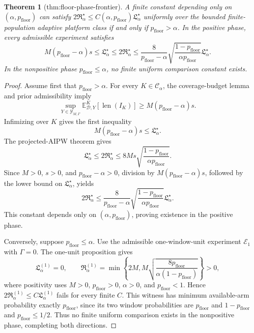 \documentclass{article}
\newtheorem{theorem}{Theorem}
\begin{document}
\begin{theorem}[thm:floor-phase-frontier]\label{thm:floor-phase-frontier}
A finite constant depending only on \((\alpha,p_{\mathrm{floor}})\) can satisfy \(2\mathfrak R_\alpha^\star\le C(\alpha,p_{\mathrm{floor}})\mathfrak L_\alpha^\star\) uniformly over the bounded finite-population adaptive platform class if and only if \(p_{\mathrm{floor}}>\alpha\). In the positive phase, every admissible experiment satisfies \[M(p_{\mathrm{floor}}-\alpha)s\le\mathfrak L_\alpha^\star\le2\mathfrak R_\alpha^\star\le\frac{8}{p_{\mathrm{floor}}-\alpha}\sqrt{\frac{1-p_{\mathrm{floor}}}{\alpha p_{\mathrm{floor}}}}\mathfrak L_\alpha^\star.\] In the nonpositive phase \(p_{\mathrm{floor}}\le\alpha\), no finite uniform comparison constant exists.
\end{theorem}
\begin{proof}
Assume first that \(p_{\mathrm{floor}}>\alpha\).  For every \(K\in\mathcal C_\alpha\), the coverage-budget lemma and prior admissibility imply
\[
 \sup_{Y\in\mathcal Y_{M,\Gamma}}
 \mathbb E^K_{\mathcal D,Y}[\operatorname{len}(I_K)]
 \ge M(p_{\mathrm{floor}}-\alpha)s.
\]
Infimizing over \(K\) gives the first inequality
\[
 M(p_{\mathrm{floor}}-\alpha)s\le\mathfrak L_\alpha^\star.
\]
The projected-AIPW theorem gives
\[
 \mathfrak L_\alpha^\star\le2\mathfrak R_\alpha^\star
 \le8Ms\sqrt{\frac{1-p_{\mathrm{floor}}}{\alpha p_{\mathrm{floor}}}}.
\]
Since \(M>0\), \(s>0\), and \(p_{\mathrm{floor}}-\alpha>0\), division by \(M(p_{\mathrm{floor}}-\alpha)s\), followed by the lower bound on \(\mathfrak L_\alpha^\star\), yields
\[
 2\mathfrak R_\alpha^\star
 \le\frac{8}{p_{\mathrm{floor}}-\alpha}
 \sqrt{\frac{1-p_{\mathrm{floor}}}{\alpha p_{\mathrm{floor}}}}
 \mathfrak L_\alpha^\star.
\]
This constant depends only on \((\alpha,p_{\mathrm{floor}})\), proving existence in the positive phase.

Conversely, suppose \(p_{\mathrm{floor}}\le\alpha\).  Use the admissible one-window-unit experiment \(\mathcal E_1\) with \(\Gamma=0\).  The one-unit proposition gives
\[
 \mathfrak L_\alpha^{(1)}=0,
 \qquad
 \mathfrak R_\alpha^{(1)}=
 \min\left\{2M,M\sqrt{\frac{8p_{\mathrm{floor}}}
 {\alpha(1-p_{\mathrm{floor}})}}\right\}>0,
\]
where positivity uses \(M>0\), \(p_{\mathrm{floor}}>0\), \(\alpha>0\), and \(p_{\mathrm{floor}}<1\).  Hence \(2\mathfrak R_\alpha^{(1)}\le C\mathfrak L_\alpha^{(1)}\) fails for every finite \(C\).  This witness has minimum available-arm probability exactly \(p_{\mathrm{floor}}\), since its two window probabilities are \(p_{\mathrm{floor}}\) and \(1-p_{\mathrm{floor}}\) and \(p_{\mathrm{floor}}\le1/2\).  Thus no finite uniform comparison exists in the nonpositive phase, completing both directions.
\end{proof}
\end{document}
